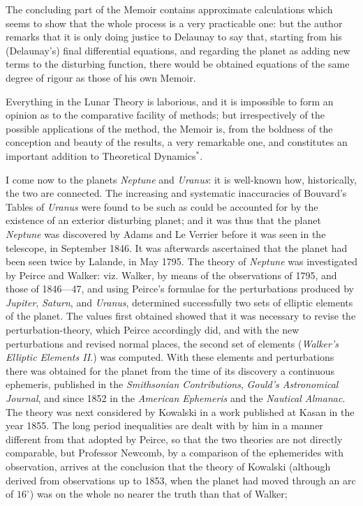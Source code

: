\documentclass[12pt,a4paper]{article}
\begin{document}
The concluding part of the Memoir contains approximate calculations which seems to show that the whole process is a very practicable one: but the author remarks that it is only doing justice to Delaunay to say that, starting from his (Delaunay's) final differential equations, and regarding the planet as adding new terms to the disturbing function, there would be obtained equations of the same degree of rigour as those of his own Memoir.

Everything in the Lunar Theory is laborious, and it is impossible to form an opinion as to the comparative facility of methods; but irrespectively of the possible applications of the method, the Memoir is, from the boldness of the conception and beauty of the results, a very remarkable one, and constitutes an important addition to Theoretical Dynamics$^*$.

I come now to the planets \textit{Neptune} and \textit{Uranus}: it is well-known how, historically, the two are connected. The increasing and systematic inaccuracies of Bouvard's Tables of \textit{Uranus} were found to be such as could be accounted for by the existence of an exterior disturbing planet; and it was thus that the planet \textit{Neptune} was discovered by Adams and Le Verrier before it was seen in the telescope, in September 1846. It was afterwards ascertained that the planet had been seen twice by Lalande, in May 1795. The theory of \textit{Neptune} was investigated by Peirce and Walker: viz. Walker, by means of the observations of 1795, and those of 1846---47, and using Peirce's formulae for the perturbations produced by \textit{Jupiter}, \textit{Saturn}, and \textit{Uranus}, determined successfully two sets of elliptic elements of the planet. The values first obtained showed that it was necessary to revise the perturbation-theory, which Peirce accordingly did, and with the new perturbations and revised normal places, the second set of elements (\textit{Walker's Elliptic Elements II.}) was computed. With these elements and perturbations there was obtained for the planet from the time of its discovery a continuous ephemeris, published in the \textit{Smithsonian Contributions}, \textit{Gould's Astronomical Journal}, and since 1852 in the \textit{American Ephemeris} and the \textit{Nautical Almanac}. The theory was next considered by Kowalski in a work published at Kasan in the year 1855. The long period inequalities are dealt with by him in a manner different from that adopted by Peirce, so that the two theories are not directly comparable, but Professor Newcomb, by a comparison of the ephemerides with observation, arrives at the conclusion that the theory of Kowalski (although derived from observations up to 1853, when the planet had moved through an arc of $16^{\circ}$) was on the whole no nearer the truth than that of Walker;
\end{document}
